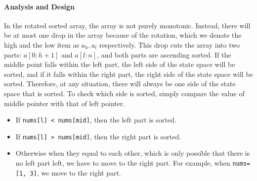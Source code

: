 \documentclass[main.tex]{subfiles}
\begin{document}
\paragraph{Analysis and Design}
In the rotated sorted array, the array is not purely monotonic. Instead, there will be at most  one drop in the array because of the rotation, which we denote the high and the low item as $a_h, a_l$ respectively. This drop  cuts the array into two parts: $a[0:h+1]$ and $a[l:n]$, and both parts are ascending sorted. If the middle point falls within the left part, the left side of the state space will be sorted, and if it falls within the right part, the right side of the state space will be sorted.  Therefore, at any situation, there will always be one side of the state space that is sorted. To check which side is sorted, simply compare the value of middle pointer with that of left pointer. 
\begin{itemize}
    \item If \texttt{nums[l] < nums[mid]}, then the left part is sorted.
    \item If \texttt{nums[l] > nums[mid]}, then the right part is sorted.
    \item Otherwise when they equal to each other, which is only possible that there is no left part left, we have to move to the right part. For example, when \texttt{nums=[1, 3]}, we move to the right part.
\end{itemize}
\end{document}
